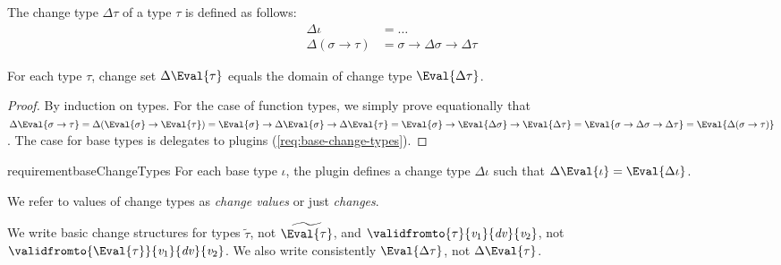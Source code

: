 \begin{definition}
  \label{def:change-types}
  The change type \ensuremath{\Delta \tau} of a type \ensuremath{\tau} is defined as follows:
\begin{align*}
  \ensuremath{\Delta \iota} &= \ldots\\
  \ensuremath{\Delta (\sigma\to \tau)} &= \ensuremath{\sigma\to \Delta \sigma\to \Delta \tau}
\end{align*}
\end{definition}
\begin{lemma}
  For each type \ensuremath{\tau}, change set \ensuremath{\Delta \Eval{\tau}} equals the domain of change
  type \ensuremath{\Eval{\Delta \tau}}.
\end{lemma}
\begin{proof}
  By induction on types. For the case of function types, we simply prove
  equationally that \ensuremath{\Delta \Eval{\sigma\to \tau}\mathrel{=}\Delta (\Eval{\sigma}\to \Eval{\tau})\mathrel{=}\Eval{\sigma}\to \Delta \Eval{\sigma}\to \Delta \Eval{\tau}\mathrel{=}\Eval{\sigma}\to \Eval{\Delta \sigma}\to \Eval{\Delta \tau}\mathrel{=}\Eval{\sigma\to \Delta \sigma\to \Delta \tau}\mathrel{=}\Eval{\Delta (\sigma\to \tau)}}. The case for base types is delegates to plugins
  (\cref{req:base-change-types}).
\end{proof}
\begin{restatable}{requirement}{baseChangeTypes}
  \label{req:base-change-types}
  For each base type \ensuremath{\iota}, the plugin defines a change type \ensuremath{\Delta \iota} such
  that \ensuremath{\Delta \Eval{\iota}\mathrel{=}\Eval{\Delta \iota}}.
\end{restatable}

We refer to values of change types as \emph{change values} or just \emph{changes}.

\begin{notation}
  We write basic change structures for types \ensuremath{\widetilde{\tau}}, not \ensuremath{\widetilde{\Eval{\tau}}},
  and \ensuremath{\validfromto{\tau}{\Varid{v}_{1}}{\Varid{dv}}{\Varid{v}_{2}}}, not \ensuremath{\validfromto{\Eval{\tau}}{\Varid{v}_{1}}{\Varid{dv}}{\Varid{v}_{2}}}. We also write
  consistently \ensuremath{\Eval{\Delta \tau}}, not \ensuremath{\Delta \Eval{\tau}}.
\end{notation}


